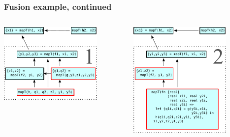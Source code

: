 \documentclass{beamer}
\begin{document}
\begin{frame}[t]
  \frametitle{Fusion example, continued}

  \centering
  \begin{columns}
    \begin{column}[T]{0.48\textwidth}
      \includegraphics[width=5cm]{img/fusion-1.pdf}
    \end{column}\hfill
    \begin{column}[T]{0.48\textwidth}
      \includegraphics[width=5cm]{img/fusion-2.pdf}
    \end{column}
  \end{columns}

\end{frame}
\end{document}
